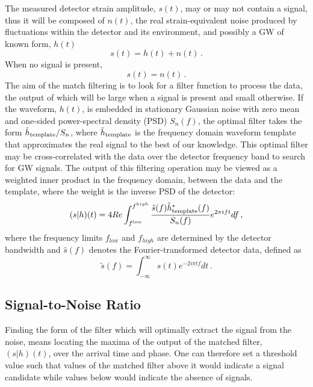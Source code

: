 \documentclass[binding=0.6cm, LaM]{sapthesis}
\begin{document}
	The measured detector strain amplitude, $s(t)$, may or may not contain a signal,
	thus it will be composed of $n(t)$, the real strain-equivalent noise
        produced by fluctuations within the detector and its environment, 
	and possibly a GW of known form, $h(t)$
        \begin{equation}
          \label{eq:strain}
          s(t) = h(t) + n(t)\,.
        \end{equation}
        When no signal is present,
        \begin{equation}
          s(t) = n(t)\,.
        \end{equation}
        The aim of the match filtering is to look for a filter function to process the data,
	the output of which will be large when a signal is present and small otherwise. 
        If the waveform, $h(t)$, is embedded in stationary Gaussian noise with zero mean and one-sided power-spectral density (PSD) $S_n(f)$,
        the optimal filter takes the form $\tilde h_{\rm template}/S_n$, where $\tilde h_{\rm template}$
        is the frequency domain waveform template that approximates the real signal to the best of our knowledge.
	This optimal filter may be cross-correlated with the data over the detector frequency band to search for GW
        signals.  The output of this filtering operation may be viewed as a weighted inner product in the frequency domain, 
	between the data and the template, where the weight is the inverse PSD of the detector:
        \begin{equation}
          (s|h)(t) = 4Re \int^{f^{high}}_{f^{low}} {{\tilde s (f) \tilde h^{*}_{\rm template}(f)} \over {S_n (f)}} e^{2 \pi ift}df\,, 
        \end{equation}
	where the frequency limits $f_{low}$ and $f_{high}$ are determined by the detector bandwidth
	and $\hat s(f)$ denotes the Fourier-transformed detector data, defined as
        \begin{equation}
          \tilde s(f) = \int^{\infty}_{-\infty} s(t) e^{-2i \pi tf} dt\,.
        \end{equation}
        
\subsection{Signal-to-Noise Ratio}
	Finding the form of the filter which will optimally extract the signal from the noise,
        means locating the maxima of the output of the matched filter, $(s|h)(t)$, 
	over the arrival time and phase.
        One can therefore set a threshold value such that values of the matched filter 
	above it would indicate a signal candidate while values below would indicate the absence of signals.
\end{document}

